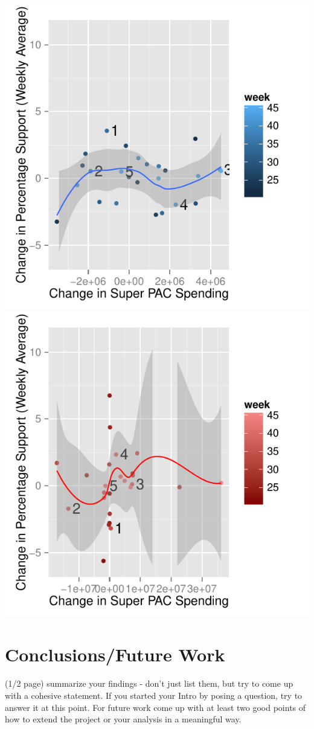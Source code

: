 \documentclass[11pt]{article}\usepackage{graphicx, color}
\newenvironment{knitrout}{}{} %
\begin{document}
\begin{knitrout}
\color{fgcolor}\includegraphics[width=.45\textwidth]{figure/support_spend1} \includegraphics[width=.45\textwidth]{figure/support_spend2} 
\end{knitrout}


\section{Conclusions/Future Work}
(1/2 page) 
summarize your findings - don't just list them, but try to come up with a cohesive statement. If you started your Intro by posing a question, try to answer it at this point.
For future work come up with at least two good points of how to extend the project or your analysis in a meaningful way.
\end{document}
